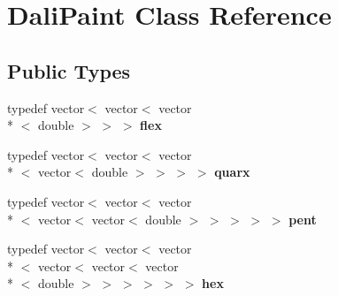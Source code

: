 \hypertarget{classDaliPaint}{\section{Dali\-Paint Class Reference}
\label{classDaliPaint}
}
\subsection*{Public Types}
\begin{DoxyCompactItemize}
\item 
\hypertarget{classDaliPaint_ac11f93a8b8fef1b6297b6ae0f8773a7e}{typedef vector$<$ vector$<$ vector\\*
$<$ double $>$ $>$ $>$ {\bfseries flex}}\label{classDaliPaint_ac11f93a8b8fef1b6297b6ae0f8773a7e}

\item 
\hypertarget{classDaliPaint_a41852dac3b5c43992a37156bd4003dc8}{typedef vector$<$ vector$<$ vector\\*
$<$ vector$<$ double $>$ $>$ $>$ $>$ {\bfseries quarx}}\label{classDaliPaint_a41852dac3b5c43992a37156bd4003dc8}

\item 
\hypertarget{classDaliPaint_a4223372000c10516d596b2711c8f6e34}{typedef vector$<$ vector$<$ vector\\*
$<$ vector$<$ vector$<$ double $>$ $>$ $>$ $>$ $>$ {\bfseries pent}}\label{classDaliPaint_a4223372000c10516d596b2711c8f6e34}

\item 
\hypertarget{classDaliPaint_a9ec046b9290d513125a98b3029c19137}{typedef vector$<$ vector$<$ vector\\*
$<$ vector$<$ vector$<$ vector\\*
$<$ double $>$ $>$ $>$ $>$ $>$ $>$ {\bfseries hex}}\label{classDaliPaint_a9ec046b9290d513125a98b3029c19137}

\end{DoxyCompactItemize}
